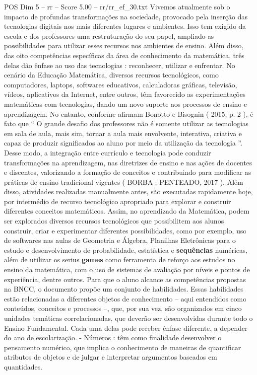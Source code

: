 \begin{textsample}{POS Dim 5 – rr – Score 5.00 – rr/rr\_ef\_30.txt}
Vivemos atualmente sob o impacto de profundas transformações na sociedade, provocado pela inserção das tecnologias digitais nos mais diferentes lugares e ambientes.
Isso tem exigido da escola e dos professores uma restruturação do seu papel, ampliado as possibilidades para utilizar esses recursos nos ambientes de ensino.
Além disso, das oito competências específicas da área de conhecimento da matemática, três delas dão ênfase ao uso das tecnologias : reconhecer, utilizar e enfrentar.
No cenário da Educação Matemática, diversos recursos tecnológicos, como computadores, laptops, softwares educativos, calculadoras gráficas, televisão, vídeos, aplicativos da Internet, entre outros, têm favorecido as experimentações matemáticas com tecnologias, dando um novo suporte aos processos de ensino e aprendizagem.
No entanto, conforme afirmam Bonotto e Bisognin ( 2015, p. 2 ), é fato que “ O grande desafio dos professores não é somente utilizar as tecnologias em sala de aula, mais sim, tornar a aula mais envolvente, interativa, criativa e capaz de produzir significados ao aluno por meio da utilização da tecnologia ”.
Desse modo, a integração entre currículo e tecnologia pode conduzir transformações na aprendizagem, nas diretrizes de ensino e nas ações de docentes e discentes, valorizando a formação de conceitos e contribuindo para modificar as práticas de ensino tradicional vigentes ( BORBA ; PENTEADO, 2017 ).
Além disso, atividades realizadas manualmente antes, são executadas rapidamente hoje, por intermédio de recurso tecnológico apropriado para explorar e construir diferentes conceitos matemáticos.
Assim, no aprendizado da Matemática, podem ser explorados diversos recursos tecnológicos que possibilitem aos alunos construir, criar e experimentar diferentes possibilidades, como por exemplo, uso de softwares nas aulas de Geometria e Álgebra, Planilhas Eletrônicas para o estudo e desenvolvimento de probabilidade, estatística e \textbf{sequências} numéricas, além de utilizar os serius \textbf{games} como ferramenta de reforço aos estudos no ensino da matemática, com o uso de sistemas de avaliação por níveis e pontos de experiência, dentre outros.
Para que o aluno alcance as competências propostas na BNCC, o documento propõe um conjunto de habilidades.
Essas habilidades estão relacionadas a diferentes objetos de conhecimento – aqui entendidos como conteúdos, conceitos e processos –, que, por sua vez, são organizados em cinco unidades temáticas correlacionadas, que deverão ser desenvolvidas durante todo o Ensino Fundamental.
Cada uma delas pode receber ênfase diferente, a depender do ano de escolarização. - Números : têm como finalidade desenvolver o pensamento numérico, que implica o conhecimento de maneiras de quantificar atributos de objetos e de julgar e interpretar argumentos baseados em quantidades.

\end{textsample}
